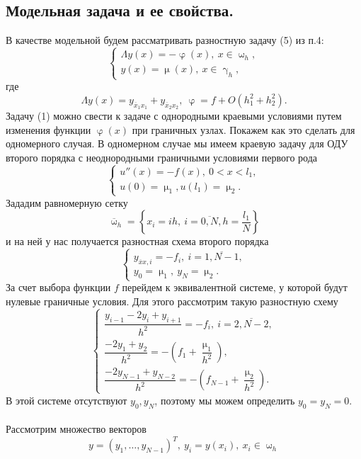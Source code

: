 \documentclass[a4paper, 12pt]{report}
\numberwithin{equation}{section}
\newcommand{\ol}{\overline}
\renewcommand{\gamma}{\upgamma}
\renewcommand{\varphi}{\upvarphi}
\renewcommand{\mu}{\upmu}
\renewcommand{\omega}{\upomega}
\begin{document}
	\subsection{Модельная задача и ее свойства.}
	В качестве модельной будем рассматривать разностную задачу (5) из п.4:
	\begin{equation}
		\begin{cases}
			\Lambda y(x) = - \varphi(x),\ x \in \omega_h,\\
		y(x) = \mu(x),\ x \in \gamma_h,
		\end{cases}
	\end{equation}
	где $$\Lambda y(x) = y _ {\ol x_1 x_1} + y_{\ol x_2 x_2},\ \varphi = f+ O(h_1 ^2 + h_2^2).$$
	Задачу (1) можно свести к задаче с однородными краевыми условиями путем изменения функции $\varphi(x)$ при граничных узлах. Покажем как это сделать для одномерного случая. В одномерном случае мы имеем краевую задачу для ОДУ второго порядка с неоднородными граничными условиями первого рода
	\begin{equation*}
		\begin{cases}
		u''(x) = -f(x),\ 0 < x < l_1,\\
		u(0) = \mu_1, u(l_1) = \mu_2.
		\end{cases}
	\end{equation*}
	Зададим равномерную сетку
	$$\ol \omega_h=\left\{x_i = ih,\ i = \ol {0, N}, h = \dfrac{l_1}{N}\right\} $$
	и на ней у нас получается разностная схема второго порядка
	\begin{equation*}
		\begin{cases}
			y_{\ol x x, i} = -f_i,\ i = \ol{1, N-1},\\
			y_0 = \mu_1,\ y_N = \mu_2.
		\end{cases}
	\end{equation*}
	За счет выбора функции $f$ перейдем к эквивалентной системе, у которой будут нулевые граничные условия. Для этого рассмотрим такую разностную схему
	$$\begin{cases}
		\dfrac{y_{i-1} - 2y_i + y_{i+1}}{h^2} = - f_i,\ i = \overline {2, N-2},\\
		\dfrac{-2 y_1 + y_2}{h^2} = -\left(f_1 + \dfrac{\mu_1}{h^2}\right),\\
		\dfrac{-2y_{N-1} + y_{N-2}}{h^2} = - \left(f_{N-1} + \dfrac{\mu_2}{h^2}\right).
	\end{cases}$$
	В этой системе отсутствуют $y_0, y_N$, поэтому мы можем определить $y_0 = y_N = 0$.\\\\
	Рассмотрим множество векторов $$y = (y_1,\ldots, y_{N-1})^T,\ y_i = y(x_i),\ x_i \in \omega_h$$
\end{document}
